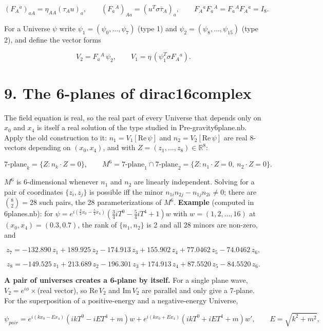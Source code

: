\documentclass[10pt]{article}
\makeatletter
\newcommand\keepnext{\par\nopagebreak\@nobreaktrue\everypar{\@nobreakfalse\everypar{}}}
\makeatother
\begin{document}
\[
(F_A{}^a)_{aA} = \eta_{AA}(\tau_A u)_a, \qquad (F_a{}^A)_{Aa} = (u^T\sigma\bar\tau_A)_a, \qquad F_A{}^aF_a{}^A = F_a{}^AF_A{}^a = I_8 .
\]

For a Universe $\psi$ write $\psi_1 = (\psi_0,\dots,\psi_7)$ (type 1) and $\psi_2 = (\psi_8,\dots,\psi_{15})$ (type 2), and define the vector forms\keepnext


\[
V_2 = F_a{}^A\,\psi_2, \qquad V_1 = \eta\,(\psi_1^T\sigma F_A{}^a) .
\]

\section*{9. The 6-planes of dirac16complex}

The field equation is real, so the real part of every Universe that depends only on $x_0$ and $x_4$ is itself a real solution of the type studied in Pre-gravity6plane.nb. Apply the old construction to it: $n_1 = V_1[\mathrm{Re}\,\psi]$ and $n_2 = V_2[\mathrm{Re}\,\psi]$ are real 8-vectors depending on $(x_0, x_4)$, and with $Z = (z_1,\dots,z_8)\in\mathbb R^8$:\keepnext


\[
\text{7-plane}_k = \{Z : n_k\cdot Z = 0\}, \qquad M^6 = \text{7-plane}_1 \cap \text{7-plane}_2 = \{Z : n_1\cdot Z = 0,\ n_2\cdot Z = 0\}.
\]

$M^6$ is 6-dimensional whenever $n_1$ and $n_2$ are linearly independent. Solving for a pair of coordinates $\{z_i, z_j\}$ is possible iff the minor $n_{1i}n_{2j} - n_{1j}n_{2i} \neq 0$; there are $\binom82 = 28$ such pairs, the 28 parameterizations of $M^6$. \textbf{Example} (computed in 6planes.nb): for $\psi = e^{i(\frac34x_0 - \frac54x_4)}(\frac34 iT^0 - \frac54 iT^4 + 1)w$ with $w = (1,2,\dots,16)$ at $(x_0,x_4) = (0.3, 0.7)$, the rank of $\{n_1, n_2\}$ is 2 and all 28 minors are non-zero, and\keepnext


\[
z_7 = -132.890\,z_1 + 189.925\,z_2 - 174.913\,z_3 + 155.902\,z_4 + 77.0462\,z_5 - 74.0462\,z_6,
\]

\[
z_8 = -149.525\,z_1 + 213.689\,z_2 - 196.301\,z_3 + 174.913\,z_4 + 87.5520\,z_5 - 84.5520\,z_6 .
\]

\textbf{A pair of universes creates a 6-plane by itself.} For a single plane wave, $V_2 = e^{i\phi}\times$(real vector), so $\mathrm{Re}\,V_2$ and $\mathrm{Im}\,V_2$ are parallel and only give a 7-plane. For the superposition of a positive-energy and a negative-energy Universe,\keepnext


\[
\psi_{pair} = e^{i(kx_0 - Ex_4)}(ikT^0 - iET^4 + m)w + e^{i(kx_0 + Ex_4)}(ikT^0 + iET^4 + m)w', \qquad E = \sqrt{k^2+m^2},
\]
\end{document}
